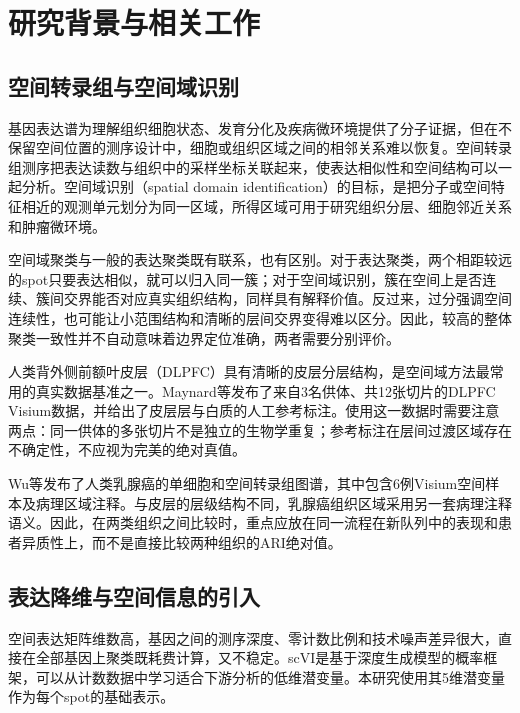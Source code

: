 \section{研究背景与相关工作}
\label{sec:cc-background-p1}

\subsection{空间转录组与空间域识别}
\label{subsec:cc-st-background-p1}
基因表达谱为理解组织细胞状态、发育分化及疾病微环境提供了分子证据，但在不保留空间位置的测序设计中，细胞或组织区域之间的相邻关系难以恢复。空间转录组测序把表达读数与组织中的采样坐标关联起来，使表达相似性和空间结构可以一起分析。空间域识别（spatial domain identification）的目标，是把分子或空间特征相近的观测单元划分为同一区域，所得区域可用于研究组织分层、细胞邻近关系和肿瘤微环境。

空间域聚类与一般的表达聚类既有联系，也有区别。对于表达聚类，两个相距较远的spot只要表达相似，就可以归入同一簇；对于空间域识别，簇在空间上是否连续、簇间交界能否对应真实组织结构，同样具有解释价值。反过来，过分强调空间连续性，也可能让小范围结构和清晰的层间交界变得难以区分。因此，较高的整体聚类一致性并不自动意味着边界定位准确，两者需要分别评价。

人类背外侧前额叶皮层（DLPFC）具有清晰的皮层分层结构，是空间域方法最常用的真实数据基准之一。Maynard等发布了来自3名供体、共12张切片的DLPFC Visium数据，并给出了皮层层与白质的人工参考标注\cite{maynard2021}。使用这一数据时需要注意两点：同一供体的多张切片不是独立的生物学重复；参考标注在层间过渡区域存在不确定性，不应视为完美的绝对真值。

Wu等发布了人类乳腺癌的单细胞和空间转录组图谱，其中包含6例Visium空间样本及病理区域注释\cite{wu2021}。与皮层的层级结构不同，乳腺癌组织区域采用另一套病理注释语义。因此，在两类组织之间比较时，重点应放在同一流程在新队列中的表现和患者异质性上，而不是直接比较两种组织的ARI绝对值。

\subsection{表达降维与空间信息的引入}
\label{subsec:cc-expression-p1}
空间表达矩阵维数高，基因之间的测序深度、零计数比例和技术噪声差异很大，直接在全部基因上聚类既耗费计算，又不稳定。scVI是基于深度生成模型的概率框架，可以从计数数据中学习适合下游分析的低维潜变量\cite{lopez2018}。本研究使用其5维潜变量作为每个spot的基础表示。


